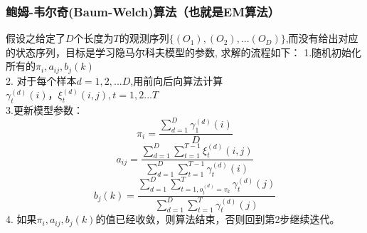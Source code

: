 \documentclass[UTF8]{article}%
\begin{document}
	\subsubsection{鲍姆-韦尔奇(Baum-Welch)算法（也就是EM算法）}
	假设之给定了$D$个长度为$T$的观测序列$\{(O_1), (O_2), ...(O_D)\}$,而没有给出对应的状态序列，目标是学习隐马尔科夫模型的参数,
	求解的流程如下：
	1.随机初始化所有的$\pi_i, a_{ij},b_{j}(k)$ \\
	2. 对于每个样本$d = 1,2,...D$,用前向后向算法计算$\gamma_t^{(d)}(i)，\xi_t^{(d)}(i,j), t =1,2...T$\\
	3.更新模型参数：
	$$\pi_i =  \frac{\sum\limits_{d=1}^D\gamma_1^{(d)}(i)}{D}$$
	$$a_{ij} = \frac{\sum\limits_{d=1}^D\sum\limits_{t=1}^{T-1}\xi_t^{(d)}(i,j)}{\sum\limits_{d=1}^D\sum\limits_{t=1}^{T-1}\gamma_t^{(d)}(i)}$$
	$$b_{j}(k) = \frac{\sum\limits_{d=1}^D\sum\limits_{t=1, o_t^{(d)}=v_k}^{T}\gamma_t^{(d)}(j)}{\sum\limits_{d=1}^D\sum\limits_{t=1}^{T}\gamma_t^{(d)}(j)}$$
	4. 如果$\pi_i, a_{ij},b_{j}(k)$的值已经收敛，则算法结束，否则回到第2步继续迭代。
	
\end{document}
